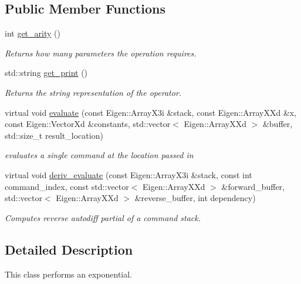 \subsection*{Public Member Functions}
\begin{DoxyCompactItemize}
\item 
int \hyperlink{classExp_a4174a935068765b990ab706e7ec1bbbe}{get\+\_\+arity} ()\hypertarget{classExp_a4174a935068765b990ab706e7ec1bbbe}{}\label{classExp_a4174a935068765b990ab706e7ec1bbbe}

\begin{DoxyCompactList}\small\item\em Returns how many parameters the operation requires. \end{DoxyCompactList}\item 
std\+::string \hyperlink{classExp_a591369485b6ce08f11132ca81225d0d4}{get\+\_\+print} ()\hypertarget{classExp_a591369485b6ce08f11132ca81225d0d4}{}\label{classExp_a591369485b6ce08f11132ca81225d0d4}

\begin{DoxyCompactList}\small\item\em Returns the string representation of the operator. \end{DoxyCompactList}\item 
virtual void \hyperlink{classExp_a12142e937f2fa11002ebe3d574626aa5}{evaluate} (const Eigen\+::\+Array\+X3i \&stack, const Eigen\+::\+Array\+X\+Xd \&x, const Eigen\+::\+Vector\+Xd \&constants, std\+::vector$<$ Eigen\+::\+Array\+X\+Xd $>$ \&buffer, std\+::size\+\_\+t result\+\_\+location)
\begin{DoxyCompactList}\small\item\em evaluates a single command at the location passed in \end{DoxyCompactList}\item 
virtual void \hyperlink{classExp_aaf9e4870dcd8eda83174f003d9bd4a8a}{deriv\+\_\+evaluate} (const Eigen\+::\+Array\+X3i \&stack, const int command\+\_\+index, const std\+::vector$<$ Eigen\+::\+Array\+X\+Xd $>$ \&forward\+\_\+buffer, std\+::vector$<$ Eigen\+::\+Array\+X\+Xd $>$ \&reverse\+\_\+buffer, int dependency)
\begin{DoxyCompactList}\small\item\em Computes reverse autodiff partial of a command stack. \end{DoxyCompactList}\end{DoxyCompactItemize}


\subsection{Detailed Description}
This class performs an exponential. 

